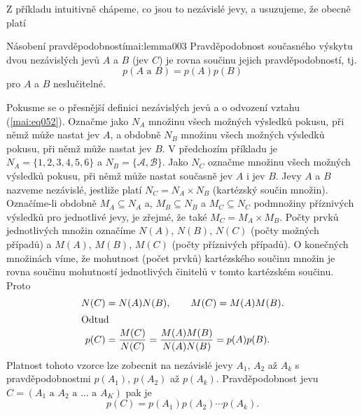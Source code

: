       Z příkladu intuitivně chápeme, co jsou to nezávislé jevy, a usuzujeme, že obecně platí
      \begin{mathlemma}{Násobení pravděpodobností}{mai:lemma003}
        Pravděpodobnost současného výskytu dvou nezávislých jevů \(A\) a \(B\) (jev \(C\)) je rovna
        součinu jejich pravděpodobností, tj.
        \begin{equation}\label{mai:eq052}
          p(A \text{ a } B)= p(A)p(B) 
        \end{equation}
        pro \(A\) a \(B\) neslučitelné.
      \end{mathlemma}
      
      Pokusme se o přesnější definici nezávislých jevů a o odvození vztahu (\ref{mai:eq052}). 
      Označme jako \(N_A\) množinu všech možných výsledků pokusu, při němž může nastat jev \(A\), a 
      obdobně \(N_B\) množinu všech možných výsledků pokusu, při němž může nastat jev \(B\). V 
      předchozím příkladu je \(N_A = \{1, 2, 3, 4, 5, 6\}\) a \(N_B = \{\mathcal{A}, 
      \mathcal{B}\}\). Jako \(N_C\) označme množinu všech možných výsledků pokusu, při němž může 
      nastat současně jev \(A\) i jev \(B\). Jevy \(A\) a \(B\) nazveme nezávislé, jestliže
      platí \(N_C = N_A \times N_B\) (kartézský součin množin). Označíme-li obdobně \(M_A \subseteq 
      N_A\) a, \(M_B \subseteq N_B\) a \(M_C \subseteq N_C\) podmnožiny příznivých výsledků pro 
      jednotlivé jevy, je zřejmé, že také \(M_C = M_A \times M_B\). Počty prvků jednotlivých množin 
      označíme \(N(A)\), \(N(B)\), \(N(C)\) (počty možných případů) a \(M(A)\), \(M(B)\), \(M(C)\) 
      (počty příznivých případů). O konečných množinách víme, že mohutnost (počet prvků) 
      kartézského součinu množin je rovna součinu mohutností jednotlivých
      činitelů v tomto kartézském součinu. Proto
      \begin{align*}
        N(C) &= N(A)N(B),\qquad M(C) = M(A)M(B). \\
        \shortintertext{Odtud}
        p(C) &= \dfrac{M(C)}{N(C)} = \dfrac{M(A)M(B)}{N(A)N(B)} = p(A)p(B).
      \end{align*}
      Platnost tohoto vzorce lze zobecnit na nezávislé jevy \(A_1\), \(A_2\) až \(A_k\) s 
      pravděpodobnostmi \(p(A_1)\), \(p(A_2)\) až \(p(A_k)\). Pravděpodobnost jevu \(C = (A_1\text{ 
      a }A_2\text{ a }...\text{ a }A_K)\) pak je
      \begin{equation*}
        p(C) = p(A_1)p(A_2)\cdots p(A_k).
      \end{equation*}
 
